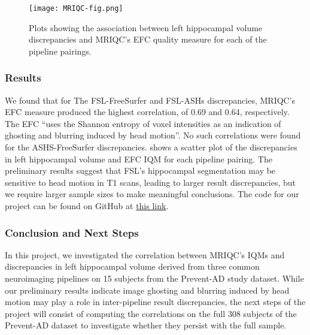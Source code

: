 \documentclass[../main.tex]{subfiles}
\begin{document}
\begin{figure}[!h]
	\centering
	\texttt{[image: MRIQC-fig.png]}
	\caption{Plots showing the association between left hippocampal volume discrepancies and MRIQC’s EFC quality measure for each of the pipeline pairings.}
	\label{fig:MRIQC-fig}
\end{figure}

\subsubsection{Results}

We found that for The FSL-FreeSurfer and FSL-ASHs discrepancies, MRIQC’s EFC measure produced the highest correlation, of 0.69 and 0.64, respectively. The EFC “uses the Shannon entropy of voxel intensities as an indication of ghosting and blurring induced by head motion”\citep{MRIQCdoc}. No such correlations were found for the ASHS-FreeSurfer discrepancies.  shows a scatter plot of the discrepancies in left hippocampal volume and EFC IQM for each pipeline pairing. The preliminary results suggest that FSL’s hippocampal segmentation may be sensitive to head motion in T1 scans, leading to larger result discrepancies, but we require larger sample sizes to make meaningful conclusions. The code for our project can be found on GitHub at \href{https://github.com/jacobsanz97/Pipeline-Discrepancy-Exploration}{this link}. 

\subsubsection{Conclusion and Next Steps}

In this project, we investigated the correlation between MRIQC’s IQMs and discrepancies in left hippocampal volume derived from three common neuroimaging pipelines on 15 subjects from the Prevent-AD study dataset. While our preliminary results indicate image ghosting and blurring induced by head motion may play a role in inter-pipeline result discrepancies, the next steps of the project will consist of computing the correlations on the full 308 subjects of the Prevent-AD dataset to investigate whether they persist with the full sample.
\end{document}
